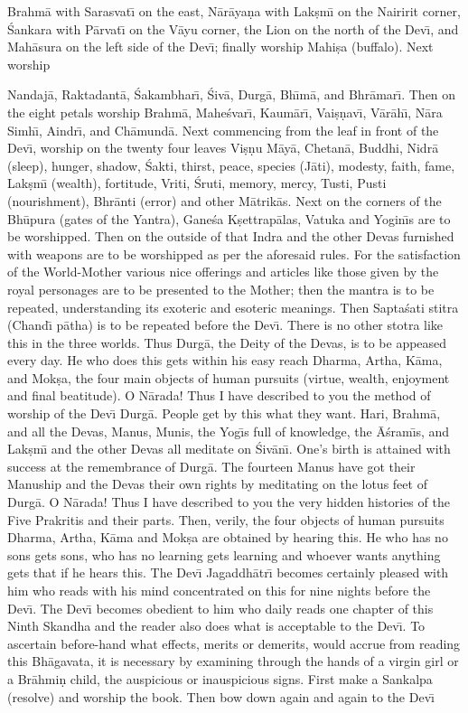 Brahm\=a with Sarasvat\={\i} on the east, N\=ar\=aya\d{n}a with Lak\d{s}m\={\i} on the Nairirit corner, \'Sankara with P\=arvat\={\i} on the V\=ayu corner, the Lion on the north of the Dev\={\i}, and Mah\=asura on the left side of the Dev\={\i}; finally worship Mahi\d{s}a (buffalo). Next worship

Nandaj\=a, Raktadant\=a, \'Sakambhar\={\i}, \'Siv\=a, Durg\=a, Bh\={\i}m\=a, and Bhr\=amar\={\i}. Then on the eight petals worship Brahm\=a, Mahe\'svar\={\i}, Kaum\=ar\={\i}, Vai\d{s}\d{n}av\={\i}, V\=ar\=ah\={\i}, N\=ara Simh\={\i}, Aindr\={\i}, and Ch\=amund\=a. Next commencing from the leaf in front of the Dev\={\i}, worship on the twenty four leaves Vi\d{s}\d{n}u M\=ay\=a, Chetan\=a, Buddhi, Nidr\=a (sleep), hunger, shadow, \'Sakti, thirst, peace, species (J\=ati), modesty, faith, fame, Lak\d{s}m\={\i} (wealth), fortitude, Vriti, \'Sruti, memory, mercy, Tusti, Pusti (nourishment), Bhr\=anti (error) and other M\=atrik\=as. Next on the corners of the Bh\=upura (gates of the Yantra), Gane\'sa K\d{s}ettrap\=alas, Vatuka and Yogin\={\i}s are to be worshipped. Then on the outside of that Indra and the other Devas furnished with weapons are to be worshipped as per the aforesaid rules. For the satisfaction of the World-Mother various nice offerings and articles like those given by the royal personages are to be presented to the Mother; then the mantra is to be repeated, understanding its exoteric and esoteric meanings. Then Sapta\'sati stitra (Chand\={\i} p\=atha) is to be repeated before the Dev\={\i}. There is no other stotra like this in the three worlds. Thus Durg\=a, the Deity of the Devas, is to be appeased every day. He who does this gets within his easy reach Dharma, Artha, K\=ama, and Mok\d{s}a, the four main objects of human pursuits (virtue, wealth, enjoyment and final beatitude). O N\=arada! Thus I have described to you the method of worship of the Dev\={\i} Durg\=a. People get by this what they want. Hari, Brahm\=a, and all the Devas, Manus, Munis, the Yog\={\i}s full of knowledge, the \=A\'sram\={\i}s, and Lak\d{s}m\={\i} and the other Devas all meditate on \'Siv\=an\={\i}. One's birth is attained with success at the remembrance of Durg\=a. The fourteen Manus have got their Manuship and the Devas their own rights by meditating on the lotus feet of Durg\=a. O N\=arada! Thus I have described to you the very hidden histories of the Five Prakritis and their parts. Then, verily, the four objects of human pursuits Dharma, Artha, K\=ama and Mok\d{s}a are obtained by hearing this. He who has no sons gets sons, who has no learning gets learning and whoever wants anything gets that if he hears this. The Dev\={\i} Jagaddh\=atr\={\i} becomes certainly pleased with him who reads with his mind concentrated on this for nine nights before the Dev\={\i}. The Dev\={\i} becomes obedient to him who daily reads one chapter of this Ninth Skandha and the reader also does what is acceptable to the Dev\={\i}. To ascertain before-hand what effects, merits or demerits, would accrue from reading this Bh\=agavata, it is necessary by examining through the hands of a virgin girl or a Br\=ahmi\d{n} child, the auspicious or inauspicious signs. First make a Sankalpa (resolve) and worship the book. Then bow down again and again to the Dev\={\i} 